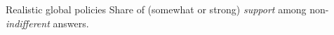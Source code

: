 \documentclass[aspectratio=169,xcolor=dvipsnames, 11pt,mathserif]{beamer}
\begin{document}
\begin{frame}{Realistic global policies}
\centering Share of (somewhat or strong) \textit{support} among non-\textit{indifferent} answers. \\
\end{frame}
\end{document}

